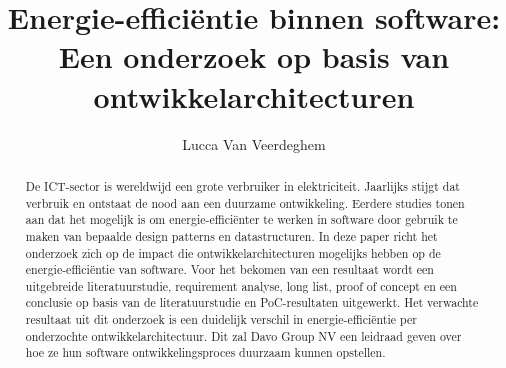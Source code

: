 \documentclass{hogent-article}
\title{Energie-efficiëntie binnen software: Een onderzoek op basis van ontwikkelarchitecturen}
\author{Lucca Van Veerdeghem}
\begin{document}
\begin{abstract}
De ICT-sector is wereldwijd een grote verbruiker in elektriciteit. Jaarlijks stijgt dat verbruik en ontstaat de nood aan een duurzame ontwikkeling. Eerdere studies tonen aan dat het mogelijk is om energie-efficiënter te werken in software door gebruik te maken van bepaalde design patterns en datastructuren. In deze paper richt het onderzoek zich op de impact die ontwikkelarchitecturen mogelijks hebben op de energie-efficiëntie van software. Voor het bekomen van een resultaat wordt een uitgebreide literatuurstudie, requirement analyse, long list, proof of concept en een conclusie op basis van de literatuurstudie en PoC-resultaten uitgewerkt. Het verwachte resultaat uit dit onderzoek is een duidelijk verschil in energie-efficiëntie per onderzochte ontwikkelarchitectuur. Dit zal Davo Group NV een leidraad geven over hoe ze hun software ontwikkelingsproces duurzaam kunnen opstellen.


    
\end{abstract}

\tableofcontents



\printbibliography[heading=bibintoc]
\end{document}
